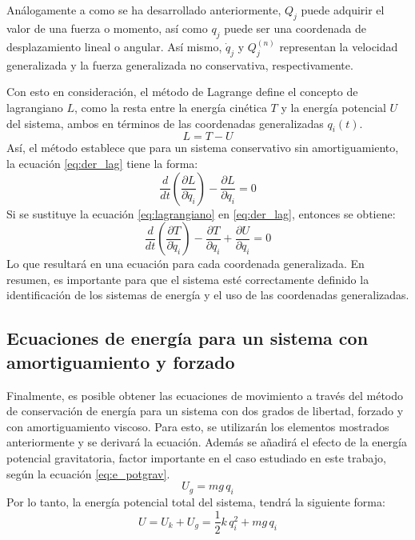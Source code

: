 Análogamente a como se ha desarrollado anteriormente, $Q_j$ puede adquirir el valor de una fuerza o momento, así como $q_j$ puede ser una coordenada de desplazamiento lineal o angular. Así mismo, $\dot{q}_j$ y $Q_j^{(n)}$ representan la velocidad generalizada y la fuerza generalizada no conservativa, respectivamente.

Con esto en consideración, el método de Lagrange define el concepto de lagrangiano $L$, como la resta entre la energía cinética $T$ y la energía potencial $U$ del sistema, ambos en términos de las coordenadas generalizadas $q_i(t)$.
\begin{equation}\label{eq:lagrangiano}
	L = T - U
\end{equation} 
Así, el método establece que para un sistema conservativo sin amortiguamiento, la ecuación \ref{eq:der_lag} tiene la forma:
\begin{equation}\label{eq:der_lag}
	\frac{d}{dt}\left(\frac{\partial L}{\partial \dot{q}_i}\right) - \frac{\partial L}{\partial q_i} = 0
\end{equation}
Si se sustituye la ecuación \ref{eq:lagrangiano} en \ref{eq:der_lag}, entonces se obtiene:
\begin{equation}\label{eq:der_lagconsv}
	\frac{d}{dt}\left(\frac{\partial T}{\partial \dot{q}_i}\right) - \frac{\partial T}{\partial q_i} + \frac{\partial U}{\partial q_i} = 0
\end{equation}
Lo que resultará en una ecuación para cada coordenada generalizada. En resumen, es importante para que el sistema esté correctamente definido la identificación de los sistemas de energía y el uso de las coordenadas generalizadas. 


\subsection{Ecuaciones de energía para un sistema con amortiguamiento y forzado}
Finalmente, es posible obtener las ecuaciones de movimiento a través del método de conservación de energía para un sistema con dos grados de libertad, forzado y con amortiguamiento viscoso. Para esto, se utilizarán los elementos mostrados anteriormente y se derivará la ecuación. Además se añadirá el efecto de la energía potencial gravitatoria, factor importante en el caso estudiado en este trabajo, según la ecuación \ref{eq:e_potgrav}. 
\begin{equation}\label{eq:e_potgrav}
	U_g = mg\,q_i
\end{equation}
Por lo tanto, la energía potencial total del sistema, tendrá la siguiente forma:
\begin{equation}\label{eq:e_potencial}
	U = U_k + U_g = \frac{1}{2}k\,q_i^2 + mg\,q_i
\end{equation}

